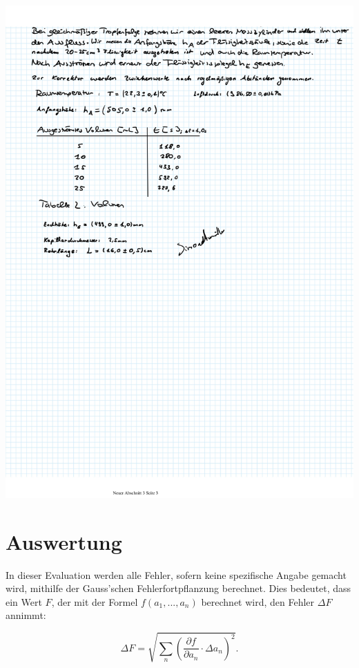 \documentclass{article}
\begin{document}
\includegraphics[width=\textwidth]{graphics/mess3.jpg}
\newpage

\addtocounter{table}{2}

\newpage
\section{Auswertung}

In dieser Evaluation werden alle Fehler, sofern keine spezifische Angabe gemacht wird, mithilfe der Gauss'schen Fehlerfortpflanzung berechnet. Dies bedeutet, dass ein Wert $F$, der mit der Formel $f(a_1, ..., a_n)$ berechnet wird, den Fehler $\Delta F$ annimmt:

\begin{equation}
    \Delta F = \sqrt{\sum_n \left( \frac{\partial f}{\partial a_n} \cdot \Delta a_n \right)^2}.
\end{equation}
\end{document}
